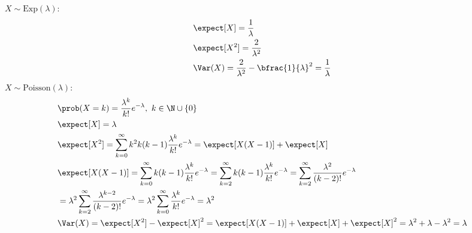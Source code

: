 $X\sim\mathrm{Exp}(\lambda)$:
\begin{align*}
    &\expect[X]=\frac{1}{\lambda}\\
    &\expect[X^2]=\frac{2}{\lambda^2}\\
    &\Var(X)=\frac{2}{\lambda^2}-\bfrac{1}{\lambda}^2=\frac{1}{\lambda}
\end{align*}
$X\sim\mathrm{Poisson}(\lambda)$:
\begin{align*}
    &\prob(X=k)=\frac{\lambda^k}{k!}e^{-\lambda},\ k\in\N\cup\{0\}\\
    &\expect[X]=\lambda\\
    &\expect[X^2]=\sum_{k=0}^\infty k^2 k(k-1)\frac{\lambda^k}{k!}e^{-\lambda}=\expect[X(X-1)]+\expect[X]\\
    &\expect[X(X-1)]=\sum_{k=0}^\infty k(k-1)\frac{\lambda^k}{k!}e^{-\lambda}=\sum_{k=2}^\infty k(k-1)\frac{\lambda^k}{k!}e^{-\lambda}=\sum_{k=2}^\infty\frac{\lambda^2}{(k-2)!}e^{-\lambda}\\
    &=\lambda^2\sum_{k=2}^\infty\frac{\lambda^{k-2}}{(k-2)!}e^{-\lambda}=\lambda^2\sum_{k=0}^\infty\frac{\lambda^k}{k!}e^{-\lambda}=\lambda^2\\
    &\Var(X)=\expect[X^2]-\expect[X]^2=\expect[X(X-1)]+\expect[X]+\expect[X]^2=\lambda^2+\lambda-\lambda^2=\lambda
\end{align*}

